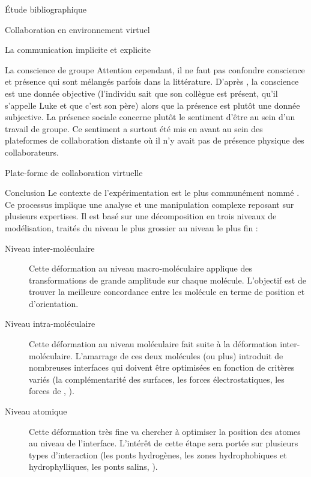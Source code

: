 \documentclass[myfrancais,ngerman,english,frenchb]{mythesis}
\begin{document}
\begin{mychapter}{Étude bibliographique}
\begin{mysection}{Collaboration en environnement virtuel}
\begin{mysubsection}{La communication implicite et explicite}
\begin{mysubsubsection}{La conscience de groupe}
					Attention cependant, il ne faut pas confondre conscience et présence qui sont mélangés parfois dans la littérature.
					D'après , la conscience est une donnée objective (l'individu sait que son collègue est présent, qu'il s'appelle Luke et que c'est son père) alors que la présence est plutôt une donnée subjective.
					La présence sociale concerne plutôt le sentiment d'être au sein d'un travail de groupe.
					Ce sentiment a surtout été mis en avant au sein des plateformes de collaboration distante où il n'y avait pas de présence physique des collaborateurs.
				\end{mysubsubsection}
			\end{mysubsection}
			\begin{mysubsection}{Plate-forme de collaboration virtuelle}
			\end{mysubsection}
		\end{mysection}
		\begin{mysection}{Conclusion}
			Le contexte de l'expérimentation est le  plus communément nommé .
			Ce processus implique une analyse et une manipulation complexe reposant sur plusieurs expertises.
			Il est basé sur une décomposition en trois niveaux de modélisation, traités du niveau le plus grossier au niveau le plus fin :
			\begin{description}
				\item[Niveau inter-moléculaire] Cette déformation au niveau macro-moléculaire applique des transformations de grande amplitude sur chaque molécule.
					L'objectif est de trouver la meilleure concordance entre les molécule en terme de position et d'orientation.
				\item[Niveau intra-moléculaire] Cette déformation au niveau moléculaire fait suite à la déformation inter-moléculaire.
					L'amarrage de ces deux molécules (ou plus) introduit de nombreuses interfaces qui doivent être optimisées en fonction de critères variés (la complémentarité des surfaces, les forces électrostatiques, les forces de  , \myetc).
				\item[Niveau atomique] Cette déformation très fine va chercher à optimiser la position des atomes au niveau de l'interface.
					L'intérêt de cette étape sera portée sur plusieurs types d'interaction (les ponts hydrogènes, les zones hydrophobiques et hydrophylliques, les ponts salins, \myetc).
			\end{description}


\end{mysection}
\end{mychapter}
\end{document}
